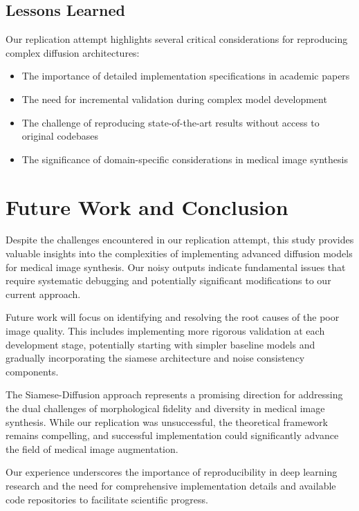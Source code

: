\documentclass[conference]{IEEEtran}
\begin{document}
\subsection{Lessons Learned}
Our replication attempt highlights several critical considerations for reproducing complex diffusion architectures:
\begin{itemize}
    \item The importance of detailed implementation specifications in academic papers
    \item The need for incremental validation during complex model development
    \item The challenge of reproducing state-of-the-art results without access to original codebases
    \item The significance of domain-specific considerations in medical image synthesis
\end{itemize}

\section{Future Work and Conclusion}
Despite the challenges encountered in our replication attempt, this study provides valuable insights into the complexities of implementing advanced diffusion models for medical image synthesis. Our noisy outputs indicate fundamental issues that require systematic debugging and potentially significant modifications to our current approach.

Future work will focus on identifying and resolving the root causes of the poor image quality. This includes implementing more rigorous validation at each development stage, potentially starting with simpler baseline models and gradually incorporating the siamese architecture and noise consistency components.

The Siamese-Diffusion approach represents a promising direction for addressing the dual challenges of morphological fidelity and diversity in medical image synthesis. While our replication was unsuccessful, the theoretical framework remains compelling, and successful implementation could significantly advance the field of medical image augmentation.

Our experience underscores the importance of reproducibility in deep learning research and the need for comprehensive implementation details and available code repositories to facilitate scientific progress.


 
\end{document}
